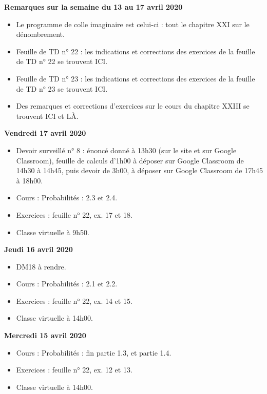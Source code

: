 \documentclass[12pt,a4paper]{article}
\begin{document}
\noindent\textbf{\bf Remarques sur la semaine du 13 au 17 avril 2020}
\begin{itemize}
\item Le programme de colle imaginaire est celui-ci : tout le chapitre XXI sur le dénombrement.
\item Feuille de TD n° 22 : les indications et corrections des exercices de la feuille de TD n° 22 se trouvent ICI.
\item Feuille de TD n° 23 : les indications et corrections des exercices de la feuille de TD n° 23 se trouvent ICI.
\item Des remarques et corrections d'exercices sur le cours du chapitre XXIII se trouvent ICI et LÀ.\vspace{.4cm}
\end{itemize}

\noindent\textbf{\bf Vendredi 17 avril 2020}
\begin{itemize}
\item Devoir surveillé n° 8 : énoncé donné à 13h30 (sur le site et sur Google Classroom), feuille de calculs d'1h00 à déposer sur Google Classroom de 14h30 à 14h45, puis devoir de 3h00, à déposer sur Google Classroom de 17h45 à 18h00.
\item Cours : Probabilités : 2.3 et 2.4.
\item Exercices : feuille n° 22, ex. 17 et 18.
\item Classe virtuelle à 9h50.\vspace{.4cm}
\end{itemize}

\noindent\textbf{Jeudi 16 avril 2020}
\begin{itemize}
\item DM18 à rendre.
\item Cours : Probabilités : 2.1 et 2.2.
\item Exercices : feuille n° 22, ex. 14 et 15.
\item Classe virtuelle à 14h00.\vspace{.4cm}
\end{itemize}

\noindent\textbf{Mercredi 15 avril 2020}
\begin{itemize}
\item Cours : Probabilités : fin partie 1.3, et partie 1.4.
\item Exercices : feuille n° 22, ex. 12 et 13.
\item Classe virtuelle à 14h00.\vspace{.4cm}
\end{itemize}
 
\end{document}

